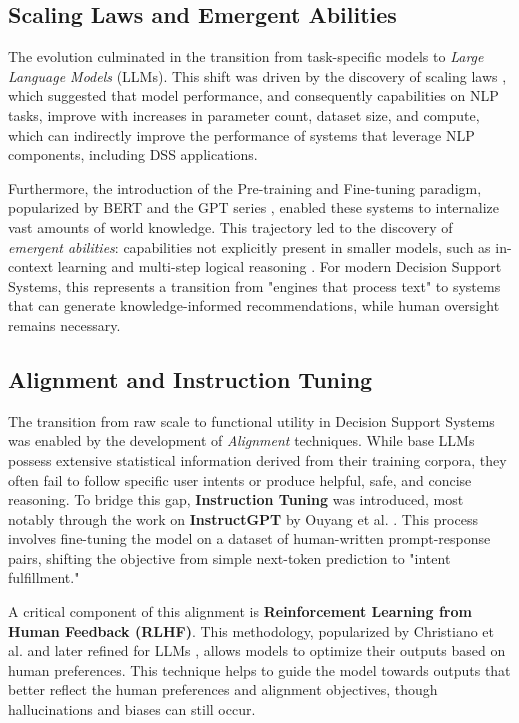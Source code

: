 \subsection{Scaling Laws and Emergent Abilities}
The evolution culminated in the transition from task-specific models to \textit{Large Language Models} (LLMs). This shift was driven by the discovery of scaling laws \cite{kaplan2020scaling}, which suggested that model performance, and consequently capabilities on NLP tasks, improve  with increases in parameter count, dataset size, and compute, which can indirectly improve the performance of systems that leverage NLP components, including DSS applications. 

Furthermore, the introduction of the Pre-training and Fine-tuning paradigm, popularized by BERT \cite{devlin2019bert} and the GPT series \cite{radford2019language}, enabled these systems to internalize vast amounts of world knowledge. This trajectory led to the discovery of \textit{emergent abilities}: capabilities not explicitly present in smaller models, such as in-context learning and multi-step logical reasoning \cite{wei2022emergent}. For modern Decision Support Systems, this represents a transition from "engines that process text" to systems that can generate knowledge-informed recommendations, while human oversight remains necessary.

\subsection{Alignment and Instruction Tuning}
The transition from raw scale to functional utility in Decision Support Systems was enabled by the development of \textit{Alignment} techniques. While base LLMs possess extensive statistical information derived from their training corpora, they often fail to follow specific user intents or produce helpful, safe, and concise reasoning. To bridge this gap, \textbf{Instruction Tuning} was introduced, most notably through the work on \textbf{InstructGPT} by Ouyang et al. \cite{ouyang2022training}. This process involves fine-tuning the model on a dataset of human-written prompt-response pairs, shifting the objective from simple next-token prediction to "intent fulfillment."

A critical component of this alignment is \textbf{Reinforcement Learning from Human Feedback (RLHF)}. This methodology, popularized by Christiano et al. \cite{christiano2017deep} and later refined for LLMs \cite{stiennon2020learning}, allows models to optimize their outputs based on human preferences. This technique helps to guide the model towards outputs that better reflect the human preferences and alignment objectives, though hallucinations and biases can still occur.




